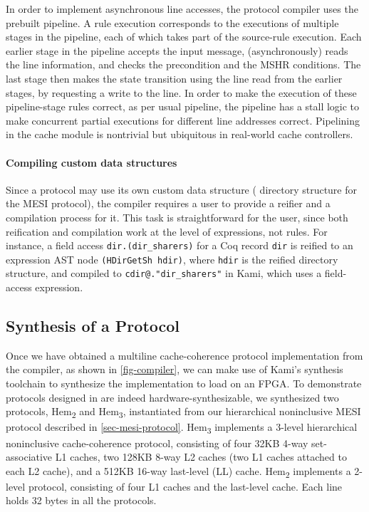 \documentclass[sigplan,10pt,review,anonymous,screen]{acmart}\settopmatter{printfolios=true,printccs=false,printacmref=false}
\def\slstinline{\lstinline[basicstyle=\ttfamily\small]}
\begin{document}
In order to implement asynchronous line accesses, the protocol compiler uses the prebuilt pipeline.
A \hemiola{} rule execution corresponds to the executions of multiple stages in the pipeline, each of which takes part of the source-rule execution.
Each earlier stage in the pipeline accepts the input message, (asynchronously) reads the line information, and checks the precondition and the MSHR conditions.
The last stage then makes the state transition using the line read from the earlier stages, by requesting a write to the line.
In order to make the execution of these pipeline-stage rules correct, as per usual pipeline, the pipeline has a stall logic to make concurrent partial executions for different line addresses correct.
Pipelining in the cache module is nontrivial but ubiquitous in real-world cache controllers.

\paragraph{Compiling custom data structures}
Since a \hemiola{} protocol may use its own custom data structure (\eg{} directory structure for the MESI protocol), the compiler requires a user to provide a reifier and a compilation process for it.
This task is straightforward for the user, since both reification and compilation work at the level of expressions, not rules.
For instance, a field access \slstinline{dir.(dir_sharers)} for a Coq record \slstinline{dir} is reified to an expression AST node \slstinline{(HDirGetSh hdir)}, where \slstinline{hdir} is the reified directory structure, and compiled to \slstinline{cdir@."dir_sharers"} in Kami, which uses a field-access expression.

\subsection{Synthesis of a \hemiola{} Protocol}
\label{sec-synthesis-protocol}

\newcommand{\bhemh}{{\sf Hem\textsubscript{3}}}
\newcommand{\bhemt}{{\sf Hem\textsubscript{2}}}
\newcommand{\briscy}{{\sf Riscy}}

Once we have obtained a multiline cache-coherence protocol implementation from the compiler, as shown in \autoref{fig-compiler}, we can make use of Kami's synthesis toolchain to synthesize the implementation to load on an FPGA.
To demonstrate protocols designed in \hemiola{} are indeed hardware-synthesizable, we synthesized two \hemiola{} protocols, \bhemt{} and \bhemh{}, instantiated from our hierarchical noninclusive MESI protocol described in \autoref{sec-mesi-protocol}.
\bhemh{} implements a 3-level hierarchical noninclusive cache-coherence protocol, consisting of four 32KB 4-way set-associative L1 caches, two 128KB 8-way L2 caches (two L1 caches attached to each L2 cache), and a 512KB 16-way last-level (LL) cache.
\bhemt{} implements a 2-level protocol, consisting of four L1 caches and the last-level cache.
Each line holds 32 bytes in all the protocols.
\end{document}

